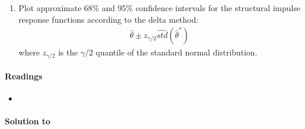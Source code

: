 \begin{enumerate}
\item Plot approximate 68\% and 95\% confidence intervals for the structural impulse response functions according to the delta method:
\begin{align*}
    \hat{\theta} \pm z_{\gamma/2} \widehat{std}(\hat{\theta}^\ast)
\end{align*}
where $z_{\gamma/2}$ is the $\gamma/2$ quantile of the standard normal distribution.
\end{enumerate}

\paragraph{Readings}
\begin{itemize}
	\item \textcite[Ch.~12.1-12.5, 12.9]{Kilian.Lutkepohl_2017_StructuralVectorAutoregressive}
\end{itemize}

\begin{solution}\textbf{Solution to }
\ifDisplaySolutions

\fi
\newpage
\end{solution}